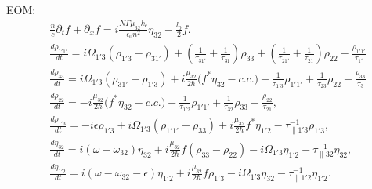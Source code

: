 \documentclass[10pt,letterpaper]{article}
\begin{document}
	EOM:
	\begin{subequations}
		\label{eq:threelevelmodel}
		\begin{align}
		&\frac{n}{c}\partial_t f + \partial_{x}f = i\frac{N \Gamma \mu_{32} k_c}{\epsilon_0 n^2} \eta_{32} - \frac{l_0}{2} f \label{eq:rtwave} .\\
		&\frac{d \rho_{1'1'}}{d t} = i\Omega_{1'3} (\rho_{1'3} - \rho_{31'}) + (\frac{1}{\tau_{31'}} + \frac{1}{\tau_{31}})\rho_{33} 
		+ (\frac{1}{\tau_{21'}} + \frac{1}{\tau_{21}})\rho_{22} - \frac{\rho_{1'1'}}{\tau_{1'}} \\
		&\frac{d \rho_{33}}{d t} = i\Omega_{1'3} (\rho_{31'} - \rho_{1'3}) + i\frac{\mu_{32}}{2\hbar} \big (f^*\eta_{32}- c.c. \big )+ \frac{1}{\tau_{1'3}}\rho_{1'1'} +  \frac{1}{\tau_{23}}\rho_{22} - \frac{\rho_{33}}{\tau_{3}}  \\
		&\frac{d \rho_{22}}{d t}  = -i\frac{\mu_{32}}{2\hbar} \big (f^*\eta_{32} - c.c. \big ) + \frac{1}{\tau_{1'2}}\rho_{1'1'}  +  \frac{1}{\tau_{32}}\rho_{33} - \frac{\rho_{22}}{\tau_{21}} , \\
		&\frac{d \rho_{1'3}}{d t}  = -i\epsilon\rho_{1'3} +i \Omega_{1'3}(\rho_{1'1'} - \rho_{33}) +i\frac{\mu_{32}}{2 \hbar}f^*\eta_{1'2}-\tau_{\parallel 1'3}^{-1} \rho_{1'3},  \\
		&\frac{d \eta_{32}}{d t}   = i(\omega - \omega_{32})\eta_{32} +i \frac{\mu_{32}}{2\hbar}f(\rho_{33}-\rho_{22}) - i\Omega_{1'3}\eta_{1'2} - \tau_{\parallel 32}^{-1}\eta_{32}, \\
		&\frac{d \eta_{1'2}}{d t}  = i(\omega - \omega_{32}-\epsilon)\eta_{1'2} +i \frac{\mu_{32}}{2\hbar}f\rho_{1'3} - i\Omega_{1'3}\eta_{32} - \tau_{\parallel 1'2}^{-1}\eta_{1'2}.
		\end{align}
	\end{subequations}
	
\end{document}
